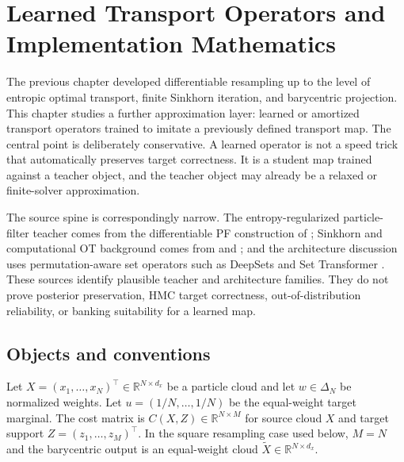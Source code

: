 \chapter{Learned Transport Operators and Implementation Mathematics}
\label{ch:bf-dpf-learned-ot}

The previous chapter developed differentiable resampling up to the level of
entropic optimal transport, finite Sinkhorn iteration, and barycentric
projection.  This chapter studies a further approximation layer: learned or
amortized transport operators trained to imitate a previously defined transport
map.  The central point is deliberately conservative.  A learned operator is not
a speed trick that automatically preserves target correctness.  It is a student
map trained against a teacher object, and the teacher object may already be a
relaxed or finite-solver approximation.

The source spine is correspondingly narrow.  The entropy-regularized
particle-filter teacher comes from the differentiable PF construction of
\citet{corenflos2021differentiable}; Sinkhorn and computational OT background
comes from \citet{cuturi2013sinkhorn} and
\citet{peyre2019computational}; and the architecture discussion uses
permutation-aware set operators such as DeepSets and Set Transformer
\citep{zaheer2017deep,lee2019set}.  These sources identify plausible teacher
and architecture families.  They do not prove posterior preservation, HMC
target correctness, out-of-distribution reliability, or banking suitability for
a learned map.

\section{Objects and conventions}
\label{sec:bf-learned-ot-objects}

Let $X=(x_1,\ldots,x_N)^\top\in\mathbb{R}^{N\times d_x}$ be a particle cloud
and let $w\in\Delta_N$ be normalized weights.  Let
$u=(1/N,\ldots,1/N)$ be the equal-weight target marginal.  The cost matrix is
$C(X,Z)\in\mathbb{R}^{N\times M}$ for source cloud $X$ and target support
$Z=(z_1,\ldots,z_M)^\top$.  In the square resampling case used below,
$M=N$ and the barycentric output is an equal-weight cloud
$\tilde X\in\mathbb{R}^{N\times d_x}$.


